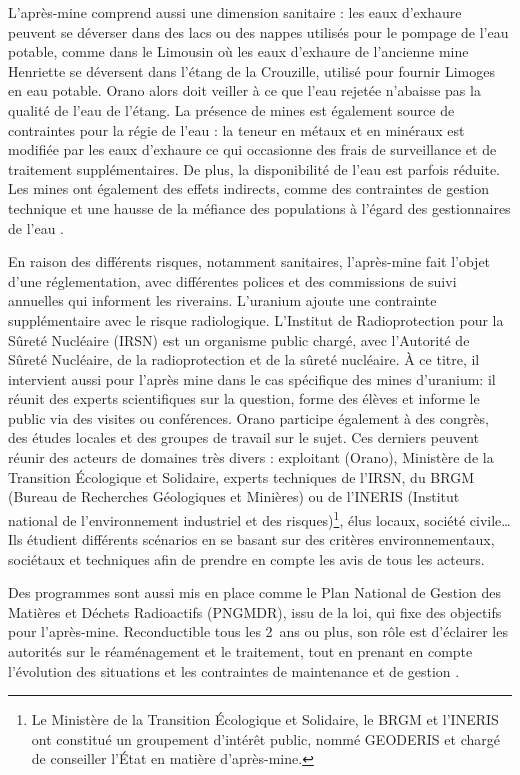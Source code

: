 \documentclass{article}
\begin{document}
L’après-mine comprend aussi une dimension sanitaire : les eaux d’exhaure peuvent se déverser dans des lacs ou des nappes utilisés pour le pompage de l’eau potable, comme dans le Limousin où les eaux d'exhaure de l'ancienne mine Henriette se déversent dans l'étang de la Crouzille, utilisé pour fournir Limoges en eau potable. Orano alors doit veiller à ce que l'eau rejetée n'abaisse pas la qualité de l'eau de l'étang. La présence de mines est également source de contraintes pour la régie de l’eau : la teneur en métaux et en minéraux est modifiée par les eaux d’exhaure ce qui occasionne des frais de surveillance et de traitement supplémentaires. De plus, la disponibilité de l’eau est parfois réduite. Les mines ont également des effets indirects, comme des contraintes de gestion technique et une hausse de la méfiance des populations à l’égard des gestionnaires de l’eau \cite{vialleseche_station_2020}.

En raison des différents risques, notamment sanitaires, l’après-mine fait l’objet d’une réglementation, avec différentes polices et des commissions de suivi annuelles qui informent les riverains.
L'uranium ajoute une contrainte supplémentaire avec le risque radiologique. L’Institut de Radioprotection pour la Sûreté Nucléaire (IRSN) est un organisme public chargé, avec l'Autorité de Sûreté Nucléaire, de la radioprotection et de la sûreté nucléaire. \`A ce titre, il intervient aussi pour l'après mine dans le cas spécifique des mines d'uranium: il réunit des experts scientifiques sur la question, forme des élèves et informe le public via des visites ou conférences. Orano participe également à des congrès, des études locales et des groupes de travail sur le sujet. Ces derniers peuvent réunir des acteurs de domaines très divers : exploitant (Orano), Ministère de la Transition Écologique et Solidaire, experts techniques de l’IRSN, du BRGM (Bureau de Recherches Géologiques et Minières) ou de l'INERIS (Institut national de l'environnement industriel et des risques)\footnote{Le Ministère de la Transition Écologique et Solidaire, le BRGM et l'INERIS ont constitué un groupement d'intérêt public, nommé GEODERIS et chargé de conseiller l'État en matière d'après-mine.}, élus locaux, société civile… Ils étudient différents scénarios en se basant sur des critères environnementaux, sociétaux et techniques afin de prendre en compte les avis de tous les acteurs.

Des programmes sont aussi mis en place comme le Plan National de Gestion des Matières et Déchets Radioactifs (PNGMDR), issu de la loi, qui fixe des objectifs pour l’après-mine. Reconductible tous les 2~ans ou plus, son rôle est d’éclairer les autorités sur le réaménagement et le traitement, tout en prenant en compte l’évolution des situations et les contraintes de maintenance et de gestion \cite{dublineau_gestion_2020}.
\end{document}
